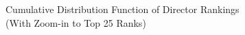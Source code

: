 \documentclass{article} %
\begin{document}
\begin{figure}[htb]
\begin{center}
\end{center}
\caption{Cumulative Distribution Function of Director Rankings \\ (With Zoom-in to Top 25 Ranks)}
\label{fig:cdf}
\end{figure}
\end{document}
